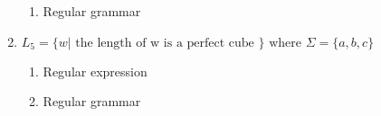 \begin{enumerate}
\begin{enumerate}
		\item{Regular grammar}
		
	\end{enumerate}
	
	\item\(L_5 = \{ w | \text{ the length of w is a perfect cube } \} \text{ where } \Sigma = \{ a, b, c \} \)
	
	\begin{enumerate}
		\item{Regular expression}
		
		\item{Regular grammar}
		
	\end{enumerate}
	
\end{enumerate}



